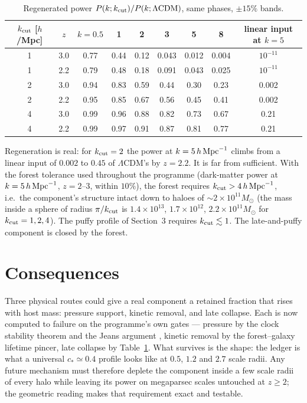 \documentclass[11pt,letterpaper]{article}
\begin{document}
\begin{table}[h]\centering\caption{Regenerated power $P(k;k_{\rm cut})/P(k;\Lambda{\rm CDM})$, same phases, $\pm15\%$ bands.}\label{regen}
\begin{tabular}{ccccccccc}\toprule
$k_{\rm cut}$ [$h$/Mpc] & $z$ & $k=0.5$ & 1 & 2 & 3 & 5 & 8 & linear input at $k=5$\\\midrule
1 & 3.0 & 0.77 & 0.44 & 0.12 & 0.043 & 0.012 & 0.004 & $10^{-11}$\\
1 & 2.2 & 0.79 & 0.48 & 0.18 & 0.091 & 0.043 & 0.025 & $10^{-11}$\\
2 & 3.0 & 0.94 & 0.83 & 0.59 & 0.44 & 0.30 & 0.23 & 0.002\\
2 & 2.2 & 0.95 & 0.85 & 0.67 & 0.56 & 0.45 & 0.41 & 0.002\\
4 & 3.0 & 0.99 & 0.96 & 0.88 & 0.82 & 0.73 & 0.67 & 0.21\\
4 & 2.2 & 0.99 & 0.97 & 0.91 & 0.87 & 0.81 & 0.77 & 0.21\\\bottomrule
\end{tabular}\end{table}

Regeneration is real: for $k_{\rm cut}=2$ the power at $k=5\,h\,{\rm Mpc}^{-1}$ climbs from a linear input of $0.002$ to $0.45$ of $\Lambda$CDM's by $z=2.2$. It is far from sufficient. With the forest tolerance used throughout the programme (dark-matter power at $k=5\,h\,{\rm Mpc}^{-1}$, $z=2$--$3$, within $10\%$), the forest requires $k_{\rm cut}>4\,h\,{\rm Mpc}^{-1}$, i.e.\ the component's structure intact down to haloes of $\sim2\times10^{11}M_\odot$ (the mass inside a sphere of radius $\pi/k_{\rm cut}$ is $1.4\times10^{13}$, $1.7\times10^{12}$, $2.2\times10^{11}M_\odot$ for $k_{\rm cut}=1,2,4$). The puffy profile of Section~3 requires $k_{\rm cut}\lesssim1$. The late-and-puffy component is closed by the forest.

\section{Consequences}
Three physical routes could give a real component a retained fraction that rises with host mass: pressure support, kinetic removal, and late collapse. Each is now computed to failure on the programme's own gates — pressure by the clock stability theorem and the Jeans argument \cite{paper17}, kinetic removal by the forest--galaxy lifetime pincer, late collapse by Table~\ref{regen}. What survives is the shape: the ledger is what a universal $c_*\simeq0.4$ profile looks like at $0.5$, $1.2$ and $2.7$ scale radii. Any future mechanism must therefore deplete the component inside a few scale radii of every halo while leaving its power on megaparsec scales untouched at $z\ge2$; the geometric reading makes that requirement exact and testable.
\end{document}

